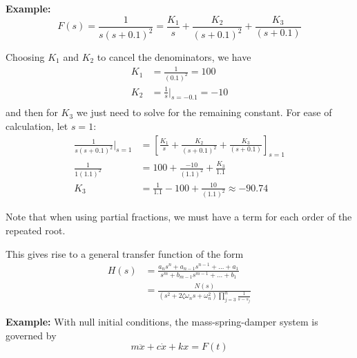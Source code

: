 \documentclass[12pt]{article}
\newcommand*{\tbf}[1]{\ifmmode\mathbf{#1}\else\textbf{#1}\fi}
\begin{document}
\tbf{Example:}
\[F(s) = \frac{1}{s(s+0.1)^2} = \frac{K_1}{s} + \frac{K_2}{(s+0.1)^2} + \frac{K_3}{(s+0.1)}\]

Choosing $K_1$ and $K_2$ to cancel the denominators, we have
\begin{align*}
    K_1 &= \frac{1}{(0.1)^2} = 100\\
    K_2 &= \frac{1}{s}\bigg\vert_{s=-0.1} = -10\\
\end{align*}
and then for $K_3$ we just need to solve for the remaining constant. For ease of calculation, let $s = 1$:
\begin{align*}
     \frac{1}{s(s+0.1)^2} \bigg\vert_{s=1} &= \left[\frac{K_1}{s} + \frac{K_2}{(s+0.1)^2} + \frac{K_3}{(s+0.1)}\right]_{s=1}\\ 
    \frac{1}{1(1.1)^2} &= 100 + \frac{-10}{(1.1)^2} + \frac{K_3}{1.1}\\ 
    K_3 &= \frac{1}{1.1} - 100 + \frac{10}{(1.1)^2} \approx -90.74
\end{align*}

Note that when using partial fractions, we must have a term for each order of the repeated root.

This gives rise to a general transfer function of the form
\begin{align*}
    H(s) &= \frac{a_n s^n + a_{n-1}s^{n-1} + \dots + a_1}{s^m + b_{m-1}s^{m-1} + \dots + b_1}\\ 
    &= \frac{N(s)}{(s^2 + 2 \zeta \omega_n s + \omega_n^2)\prod_{j=3}^n \frac{1}{s - s_j}} 
\end{align*}

\tbf{Example:} With null initial conditions, the mass-spring-damper system is governed by
\[m\ddot x + c\dot x + kx = F(t)\]

\begin{center}
\end{center}
\end{document}
